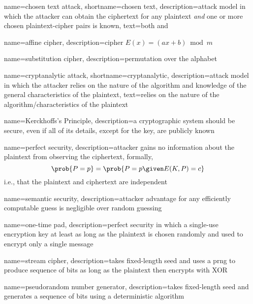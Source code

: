 {
    name={chosen text attack},
    shortname={chosen text},
    description={attack model in which the attacker can obtain the ciphertext for any plaintext \emph{and} one or more chosen plaintext-cipher pairs is known},
    text={both  and }
}

{
    name={affine cipher},
    description={cipher $E(x) = (ax + b)\bmod{m}$}
}

{
    name={substitution cipher},
    description={permutation over the alphabet}
}

{
    name={cryptanalytic attack},
    shortname={cryptanalytic},
    description={attack model in which the attacker relies on the nature of the algorithm and knowledge of the general characteristics of the plaintext},
    text={relies on the nature of the algorithm/characteristics of the plaintext}
}

{
    name={Kerckhoffs’s Principle},
    description={a cryptographic system should be secure, even if all of its details, except for the key, are publicly known}
}

{
    name={perfect security},
    description={attacker gains no information about the plaintext from observing the ciphertext, formally, \[\prob{P = p} = \prob{P = p \given E(K, P) = c}\] i.e., that the plaintext and ciphertext are independent}
}

{
    name={semantic security},
    description={attacker advantage for any efficiently computable guess is negligible over random guessing}
}

{
    name={one-time pad},
    description={perfect security in which a single-use encryption key at least as long as the plaintext is chosen randomly and used to encrypt only a single message}
}

{
    name={stream cipher},
    description={takes fixed-length seed and uses a \acrshort{prng} to produce sequence of bits as long as the plaintext then encrypts with XOR}
}

{
    name={pseudorandom number generator},
    description={takes fixed-length seed and generates a sequence of bits using a deterministic algorithm}
}

